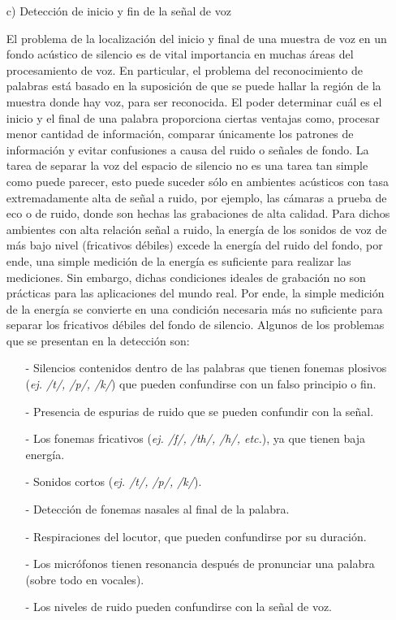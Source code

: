 \begin{enumerate}
\item[c)]Detección de inicio y fin de la señal de voz
\par
El problema de la localización del inicio y final de una muestra de voz en un fondo acústico de silencio es de vital importancia en muchas áreas del procesamiento de voz. En particular, el problema del reconocimiento de palabras está basado en la suposición de que se puede hallar la región de la muestra donde hay voz, para ser reconocida. 
\vskip 0.5cm
El poder determinar cuál es el inicio y el final de una palabra proporciona ciertas ventajas como, procesar menor cantidad de información, comparar únicamente los patrones de información y evitar confusiones a causa del ruido o señales de fondo.
\vskip 0.5cm
La tarea de separar la voz del espacio de silencio no es una tarea tan simple como puede parecer, esto puede suceder sólo en ambientes acústicos con tasa extremadamente alta de señal a ruido, por ejemplo, las cámaras a prueba de eco o de ruido, donde son hechas las grabaciones de alta calidad. Para dichos ambientes con alta relación señal a ruido, la energía de los sonidos de voz de más bajo nivel (fricativos débiles) excede la energía del ruido del fondo, por ende, una simple medición de la energía es suficiente para realizar las mediciones. 
\vskip 0.5cm
Sin embargo, dichas condiciones ideales de grabación no son prácticas para las aplicaciones del mundo real. Por ende, la simple medición de la energía se convierte en una condición necesaria más no suficiente para separar los fricativos débiles del fondo de silencio.
\vskip 0.5cm
Algunos de los problemas que se presentan en la detección son:
\begin{enumerate}
\item[-]Silencios contenidos dentro de las palabras que tienen fonemas plosivos (\textit{ej. /t/, /p/, /k/}) que pueden confundirse con un falso principio o fin. 
\item[-]Presencia de espurias de ruido que se pueden confundir con la señal. 
\item[-]Los fonemas fricativos (\textit{ej. /f/, /th/, /h/, etc.}), ya que tienen baja energía.
\item[-]Sonidos cortos (\textit{ej. /t/, /p/, /k/}).
\item[-]Detección de fonemas nasales al final de la palabra.
\item[-]Respiraciones del locutor, que pueden confundirse por su duración.
\item[-]Los micrófonos tienen resonancia después de pronunciar una palabra (sobre todo en vocales).
\item[-]Los niveles de ruido pueden confundirse con la señal de voz.
\end{enumerate}


\end{enumerate}
